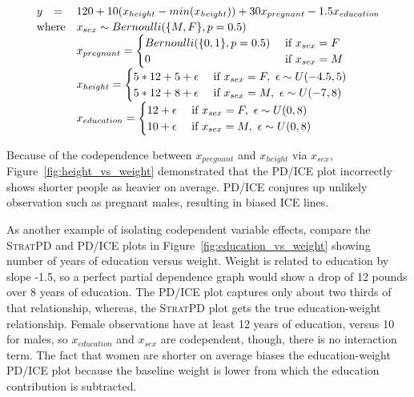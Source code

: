 \documentclass[12pt]{article}
\newcommand{\figref}[1]{Figure~\ref{#1}}
\newcommand{\spd}{\fontfamily{cmr}\textsc{\small StratPD}}
\begin{document}
\begin{equation}\label{eq:weight}
\begin{array}{rll}
y & = &120 + 10(x_{height} - min(x_{height})) + 30x_{pregnant} - 1.5x_{education}\\
\vspace{-10pt}\\
\multicolumn{2}{r}{\text{where}} & x_{sex} \sim Bernoulli(\{M,F\}, p=0.5)\\
                    & & x_{pregnant} = \begin{cases}
                                               Bernoulli(\{0,1\},p=0.5) & \text{ if } x_{sex} = F\\
                                               0 & \text{ if } x_{sex}=M\\
                                               \end{cases}\\
                    & & x_{height} = \begin{cases}
                                               5*12+5+ \epsilon & \text{ if } x_{sex}=F,~ \epsilon \sim U(-4.5,5)\\	
                                               5*12+8 + \epsilon & \text{ if } x_{sex}=M,~ \epsilon \sim U(-7,8)\\
                                               \end{cases}\\
                    & & x_{education} = \begin{cases}
                                               12 + \epsilon & \text{ if } x_{sex}=F,~ \epsilon \sim U(0,8)\\	
                                               10 + \epsilon & \text{ if } x_{sex}=M,~ \epsilon \sim U(0,8)\\
                                               \end{cases}
\end{array}
\end{equation}

Because of the codependence between $x_{pregnant}$ and $x_{height}$ via $x_{sex}$, \figref{fig:height_vs_weight} demonstrated that the PD/ICE plot incorrectly shows shorter people as heavier on average. PD/ICE conjures up unlikely observation such as pregnant males, resulting in biased ICE lines.

As another example of isolating codependent variable effects, compare the \spd{} and PD/ICE plots in \figref{fig:education_vs_weight} showing number of years of education versus weight. Weight is related to education by slope -1.5, so a perfect partial dependence graph would show a drop of 12 pounds over 8 years of education. The PD/ICE plot captures only about two thirds of that relationship, whereas, the \spd{} plot gets the true education-weight relationship.  Female observations have at least 12 years of education, versus 10 for males, so $x_{education}$ and $x_{sex}$ are codependent, though, there is no interaction term. The fact that women are shorter on average biases the education-weight PD/ICE plot because the baseline weight is lower from which the education contribution is  subtracted.
\end{document}
